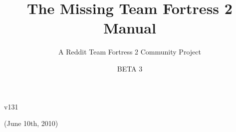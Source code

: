 \documentclass[letterpaper,12pt]{article}
\title{The Missing Team Fortress 2 Manual}
\author{A Reddit Team Fortress 2 Community Project}
\date{BETA 3}
\begin{document}
\maketitle

\vspace{140 mm}
\begin{center}v131 \end{center}

\begin{center}(June 10th, 2010) \end{center}



\thispagestyle{empty}
\newpage
\pagestyle{headings}
\setcounter{page}{1}

\tableofcontents


\newpage
\setcounter{page}{1}



\newpage



\newpage


\newpage


\newpage


\newpage


\newpage


\newpage

\end{document}
